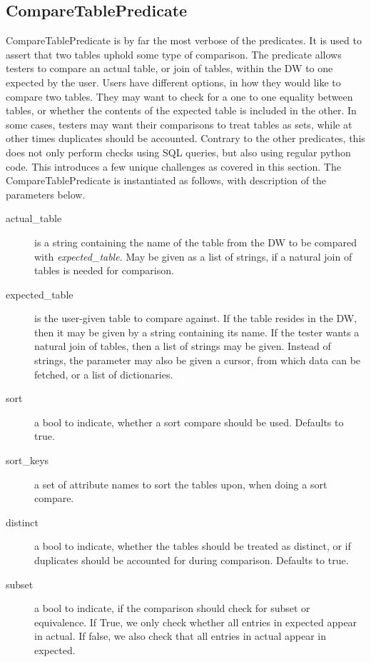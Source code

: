\subsection{CompareTablePredicate}
CompareTablePredicate is by far the most verbose of the predicates. It is used to assert that two tables uphold some type of comparison. The predicate allows testers to compare an actual table, or join of tables, within the DW to one expected by the user. Users have different options, in how they would like to compare two tables. They may want to check for a one to one equality between tables, or whether the contents of the expected table is included in the other. In some cases, testers may want their comparisons to treat tables as sets, while at other times duplicates should be accounted. Contrary to the other predicates, this does not only perform checks using SQL queries, but also using regular python code. This introduces a few unique challenges as covered in this section. The CompareTablePredicate is instantiated as follows, with description of the parameters below.


\begin{description}
\item [actual\_table] is a string containing the name of the table from the DW to be compared with \textit{expected\_table}. May be given as a list of strings, if a natural join of tables is needed for comparison.
\item [expected\_table] is the user-given table to compare against. If the table resides in the DW, then it may be given by a string containing its name. If the tester wants a natural join of tables, then a list of strings may be given. Instead of strings, the parameter may also be given a cursor, from which data can be fetched, or a list of dictionaries.
\item [sort] a bool to indicate, whether a sort compare should be used. Defaults to true.
\item [sort\_keys] a set of attribute names to sort the tables upon, when doing a sort compare.
\item [distinct] a bool to indicate, whether the tables should be treated as distinct, or if duplicates should be accounted for during comparison. Defaults to true.
\item [subset] a bool to indicate, if the comparison should check for subset or equivalence.  If True, we only check whether all entries in expected appear in actual. If false, we also check that all entries in actual appear in expected. 
\end{description}

